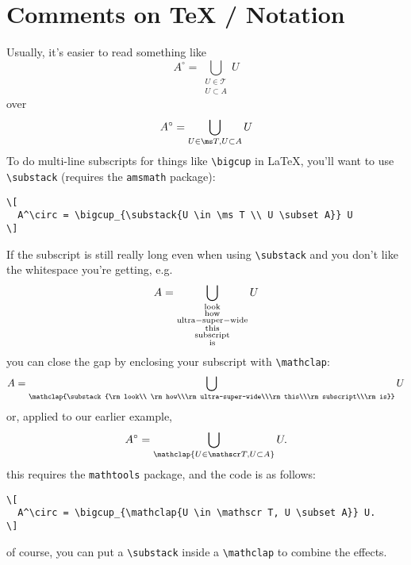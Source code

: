 \documentclass{fkpset}
\begin{document}
\section{Comments on TeX / Notation}
\begin{problem}[C1]
  Usually, it's easier to read something like
  \[
    A^\circ = \bigcup_{\substack{U \in \mathscr T \\ U \subset A}} U
  \]
  over
  \[
    A^\circ = \bigcup_{U \in \ms T, U \subset A} U
  \]
  To do multi-line subscripts for things like \verb|\bigcup| in \LaTeX, you'll
  want to use \verb|\substack| (requires the \texttt{amsmath} package):
  \begin{lstlisting}
\[
  A^\circ = \bigcup_{\substack{U \in \ms T \\ U \subset A}} U
\]\end{lstlisting}\vspace{-3em}
  If the subscript is still really long even when using \verb|\substack| and you
  don't like the whitespace you're getting, e.g.
  \[
    A = \bigcup_{\substack{\rm look\\ \rm how\\\rm ultra-super-wide\\\rm
        this\\\rm subscript\\\rm is}} U
  \]
  you can close the gap by enclosing your subscript with \verb|\mathclap|:
  \[
    A = \bigcup_{\mathclap{\substack{\rm look\\ \rm how\\\rm ultra-super-wide\\\rm
        this\\\rm subscript\\\rm is}}} U
  \]
  or, applied to our earlier example,
  \[
    A^\circ = \bigcup_{\mathclap{U \in \mathscr T, U \subset A}} U.
  \]
  this requires the \texttt{mathtools} package, and the code is as follows:
  \begin{lstlisting}
\[
  A^\circ = \bigcup_{\mathclap{U \in \mathscr T, U \subset A}} U.
\]\end{lstlisting}\vspace{-3em}
  of course, you can put a \verb|\substack| inside a \verb|\mathclap| to combine
  the effects.
\end{problem}
\end{document}

